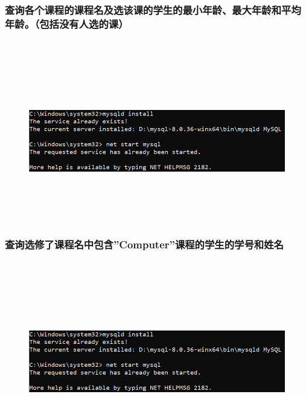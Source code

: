 \documentclass{ctexart}
\begin{document}
\subsubsection{查询各个课程的课程名及选该课的学生的最小年龄、最大年龄和平均年龄。（包括没有人选的课）}
\begin{lstlisting}[language=sql]
	
\end{lstlisting}
\begin{figure}[H]
	\centering 
	\includegraphics[height=7cm,width=14cm]{1.png}
	\end{figure}
\subsubsection{查询选修了课程名中包含”Computer”课程的学生的学号和姓名}
\begin{lstlisting}[language=sql]
	
\end{lstlisting}
\begin{figure}[H]
	\centering 
	\includegraphics[height=7cm,width=14cm]{1.png}
	\end{figure}
\end{document}
